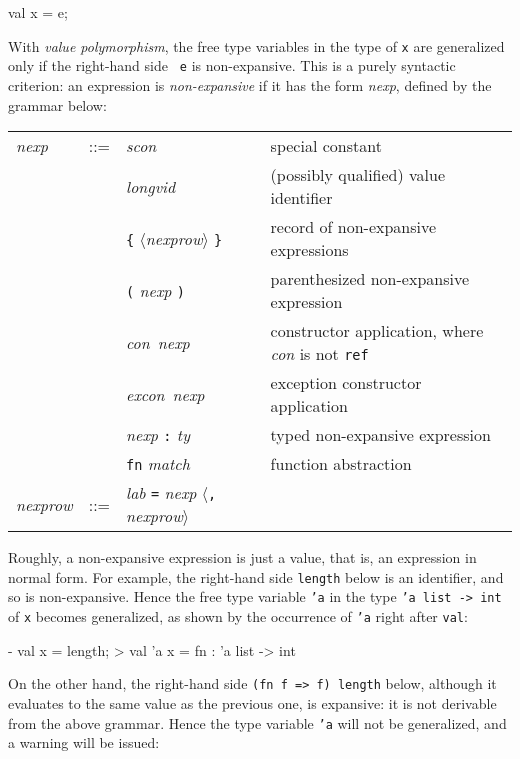 \documentclass[fleqn]{article}
\begin{document}
\begin{program}
val x = e;
\end{program}

\noindent With {\em value polymorphism\/}, the free type variables in
the type of {\tt x} are generalized only if the right-hand side {\tt
  e} is non-expansive.  This is a purely syntactic criterion: an
expression is {\em non-expansive\/} if it has the form {\it nexp\/},
defined by the grammar below:

\begin{quot} 
\begin{tabular}{@{}lcll}
{\it nexp} & ::= & {\it scon\/}  & special constant\\
&& {\it longvid\/} & (possibly qualified) value identifier\\           
&& \verb#{# $\langle${\it nexprow\/}$\rangle$ \verb#}# & record of
non-expansive expressions\\
&& \verb#(# {\it nexp\/} \verb#)# & parenthesized non-expansive expression\\
&& {\it con\/}\ {\it nexp\/} & constructor application, where {\it con\/}
is not {\tt ref}\\
&& {\it excon\/}\ {\it nexp\/} & exception constructor application\\
&& {\it nexp} \verb#:# {\it ty\/} & typed non-expansive expression\\
&& \verb#fn# {\it match} & function abstraction\\[2ex]

{\it nexprow} & ::= & {\it lab\/} \verb#=# {\it nexp\/}
$\langle$\verb#,# {\it nexprow\/}$\rangle$  \\
\end{tabular}
\end{quot}

\noindent Roughly, a non-expansive expression is just a value, that
is, an expression in normal form.  For example, the right-hand side
{\tt length} below is an identifier, and so is non-expansive.  Hence
the free type variable {\tt 'a} in the type {\tt 'a list -> int} of
{\tt x} becomes generalized, as shown by the occurrence of \texttt{'a}
right after \texttt{val}:

\begin{program}
- val x = length;
> val 'a x = fn : 'a list -> int
\end{program}

\noindent On the other hand, the right-hand side {\tt (fn f => f)
  length} below, although it evaluates to the same value as the
previous one, is expansive: it is not derivable from the above
grammar.  Hence the type variable {\tt 'a} will not be generalized,
and a warning will be issued:
\end{document}
